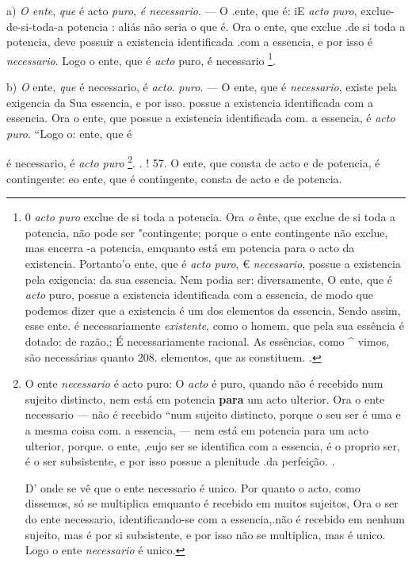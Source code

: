 a) \emph{O ente}, \emph{que} é acto \emph{puro}, \emph{é necessario}. --- O .ente, que é: iE \emph{acto puro}, exclue-de-si-toda-a potencia : aliás não seria o que é. Ora o ente, que exclue .de si toda a potencia, deve possuir a existencia identificada .com a essencia, e por isso é \emph{necessario}. Logo o ente, que é \emph{acto} puro, é necessario \footnote{0 \emph{acto puro} exclue de si toda a potencia. Ora \emph{o} ênte, que exclue de si toda a potencia, não pode ser "contingente; porque o ente contingente não exclue, mas encerra -a potencia, emquanto está em potencia para o acto da existencia. Portanto'o ente, que é \emph{acto puro}, € \emph{necessario}, possue a existencia pela exigencia: da sua essencia. Nem podia ser: diversamente, O ente, que é \emph{acto} puro, possue a existencia identificada com a essencia, de modo que podemos dizer que a existencia é um dos elementos da essencia, Sendo assim, esse ente. é necessariamente \emph{existente}, como o homem, que pela sua essência é dotado: de razão,; É necessariamente racional. As essências, como \textasciicircum{} vimos, são necessárias quanto 208. elementos, que as constituem. .}.

b) \emph{O} ente, \emph{que} é necessario, é \emph{acto}. \emph{puro}. --- O ente, que é \emph{necessario}, existe pela exigencia da Sua essencia, e por isso. possue a existencia identificada com a essencia. Ora o ente, que possue a existencia identificada com. a essencia, é \emph{acto puro}. “Logo o: ente, que é

é necessario, é \emph{acto puro} \footnote{O ente \emph{necessario} é acto puro: O \emph{acto} é puro, quando não é recebido num sujeito distincto, nem está em potencia \textbf{para} um acto ulterior. Ora o ente necessario --- não é recebido “num sujeito distincto, porque o seu ser é uma e a mesma coisa com. a essencia, --- nem está em potencia para um acto ulterior, porque. o ente, ,eujo ser se identifica com a essencia, é o proprio ser, é o ser subsistente, e por isso possue a plenitude .da perfeição. .\par D' onde se vê que o ente necessario é unico. Por quanto o acto, como dissemos, só se multiplica emquanto é recebido em muitos sujeitos, Ora o ser do ente necessario, identificando-se com a essencia,.não é recebido em nenhum sujeito, mas é por si subsistente, e por isso não se multiplica, mas é unico. Logo o ente \emph{necessario} é unico.}. . ! 57. O ente, que consta de acto e de potencia, é contingente: eo ente, que é contingente, consta de acto e de potencia.

